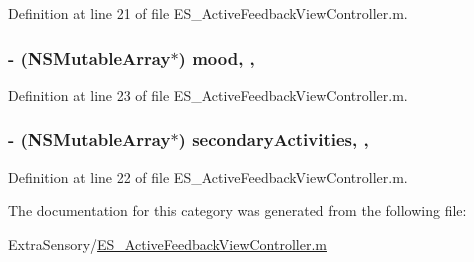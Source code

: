 Definition at line 21 of file E\+S\+\_\+\+Active\+Feedback\+View\+Controller.\+m.

\hypertarget{category_e_s___active_feedback_view_controller_07_08_ac338e9eeb12c2d6560270939aa2565b0}{
\subsubsection[{mood}]{\setlength{\rightskip}{0pt plus 5cm}-\/ (N\+S\+Mutable\+Array$\ast$) mood\hspace{0.3cm}{\ttfamily [read]}, {\ttfamily [write]}, {\ttfamily [atomic]}}}\label{category_e_s___active_feedback_view_controller_07_08_ac338e9eeb12c2d6560270939aa2565b0}


Definition at line 23 of file E\+S\+\_\+\+Active\+Feedback\+View\+Controller.\+m.

\hypertarget{category_e_s___active_feedback_view_controller_07_08_a4c9d5fe2285d36b52a7d99643f0ded0b}{
\subsubsection[{secondary\+Activities}]{\setlength{\rightskip}{0pt plus 5cm}-\/ (N\+S\+Mutable\+Array$\ast$) secondary\+Activities\hspace{0.3cm}{\ttfamily [read]}, {\ttfamily [write]}, {\ttfamily [atomic]}}}\label{category_e_s___active_feedback_view_controller_07_08_a4c9d5fe2285d36b52a7d99643f0ded0b}


Definition at line 22 of file E\+S\+\_\+\+Active\+Feedback\+View\+Controller.\+m.



The documentation for this category was generated from the following file\+:\begin{DoxyCompactItemize}
\item 
Extra\+Sensory/\hyperlink{_e_s___active_feedback_view_controller_8m}{E\+S\+\_\+\+Active\+Feedback\+View\+Controller.\+m}\end{DoxyCompactItemize}
